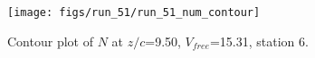 \begin{figure}[H]
\centering
\texttt{[image: figs/run\_51/run\_51\_num\_contour]}
\caption{Contour plot of $N$ at $z/c$=9.50, $V_{free}$=15.31, station 6.}
\label{fig:run_51_num_contour}
\end{figure}


